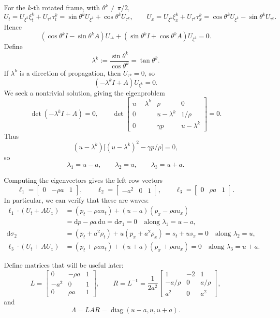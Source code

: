 \documentclass[11pt]{article}
\newcommand{\dd}{\mathrm{d}}
\begin{document}
For the \(k\)-th rotated frame, with \(\theta^k\ne\pi/2\),
\[
U_t
=U_{\xi^k}\xi_t^k+U_{\tau^k}\tau_t^k
=\sin\theta^k U_{\xi^k}+\cos\theta^k U_{\tau^k},
\qquad
U_x
=U_{\xi^k}\xi_x^k+U_{\tau^k}\tau_x^k
=\cos\theta^k U_{\xi^k}-\sin\theta^k U_{\tau^k}.
\]
Hence
\[
(\cos\theta^k I-\sin\theta^k A)U_{\tau^k}
+(\sin\theta^k I+\cos\theta^k A)U_{\xi^k}=0.
\]
Define
\[
\lambda^k:=\frac{\sin\theta^k}{\cos\theta^k}=\tan\theta^k.
\]
If \(\lambda^k\) is a direction of propagation, then \(U_{\tau^k}=0\), so
\[
(-\lambda^kI+A)U_{\xi^k}=0.
\]
We seek a nontrivial solution, giving the eigenproblem
\[
\det(-\lambda^k I+A)=0,
\qquad
\det\begin{bmatrix}
u-\lambda^k&\rho&0\\
0&u-\lambda^k&1/\rho\\
0&\gamma p&u-\lambda^k
\end{bmatrix}=0.
\]
Thus
\[
(u-\lambda^k)\bigl[(u-\lambda^k)^2-\gamma p/\rho\bigr]=0,
\]
so
\[
\lambda_1=u-a,\qquad \lambda_2=u,\qquad \lambda_3=u+a.
\]

Computing the eigenvectors gives the left row vectors
\[
\ell_1=\begin{bmatrix}0&-\rho a&1\end{bmatrix},
\qquad
\ell_2=\begin{bmatrix}-a^2&0&1\end{bmatrix},
\qquad
\ell_3=\begin{bmatrix}0&\rho a&1\end{bmatrix}.
\]
In particular, we can verify that these are waves:
\[
\begin{aligned}
\ell_1\mathbin{\cdot}(U_t+A U_x)
&=(p_t-\rho a u_t)+(u-a)(p_x-\rho a u_x)\\
&=\dd p-\rho a\,\dd u=\dd\sigma_1=0
\quad\text{along }\lambda_1=u-a,\\
\dd\sigma_2
&=(p_t+a^2\rho_t)+u(p_x+a^2\rho_x)
=s_t+u s_x=0
\quad\text{along }\lambda_2=u,\\
\ell_3\mathbin{\cdot}(U_t+A U_x)
&=(p_t+\rho a u_t)+(u+a)(p_x+\rho a u_x)=0
\quad\text{along }\lambda_3=u+a.
\end{aligned}
\]

Define matrices that will be useful later:
\[
L=
\begin{bmatrix}
0&-\rho a&1\\
-a^2&0&1\\
0&\rho a&1
\end{bmatrix},
\qquad
R=L^{-1}
=\frac{1}{2a^2}
\begin{bmatrix}
1&-2&1\\
-a/\rho&0&a/\rho\\
a^2&0&a^2
\end{bmatrix},
\]
and
\[
\Lambda=LAR=\operatorname{diag}(u-a,u,u+a).
\]
\end{document}
